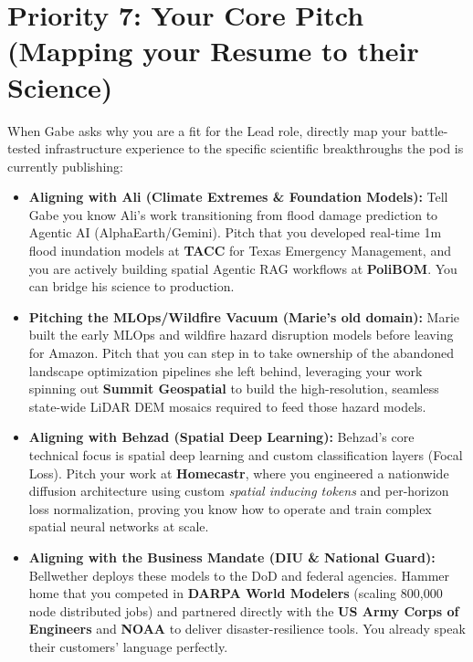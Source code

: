 \documentclass[11pt]{article}
\begin{document}
\section{Priority 7: Your Core Pitch (Mapping your Resume to their Science)}
When Gabe asks why you are a fit for the Lead role, directly map your battle-tested infrastructure experience to the specific scientific breakthroughs the pod is currently publishing:

\begin{itemize}[leftmargin=*]
    \item \textbf{Aligning with Ali (Climate Extremes \& Foundation Models):} Tell Gabe you know Ali's work transitioning from flood damage prediction to Agentic AI (AlphaEarth/Gemini). Pitch that you developed real-time 1m flood inundation models at \textbf{TACC} for Texas Emergency Management, and you are actively building spatial Agentic RAG workflows at \textbf{PoliBOM}. You can bridge his science to production.
    \item \textbf{Pitching the MLOps/Wildfire Vacuum (Marie's old domain):} Marie built the early MLOps and wildfire hazard disruption models before leaving for Amazon. Pitch that you can step in to take ownership of the abandoned landscape optimization pipelines she left behind, leveraging your work spinning out \textbf{Summit Geospatial} to build the high-resolution, seamless state-wide LiDAR DEM mosaics required to feed those hazard models.
    \item \textbf{Aligning with Behzad (Spatial Deep Learning):} Behzad's core technical focus is spatial deep learning and custom classification layers (Focal Loss). Pitch your work at \textbf{Homecastr}, where you engineered a nationwide diffusion architecture using custom \textit{spatial inducing tokens} and per-horizon loss normalization, proving you know how to operate and train complex spatial neural networks at scale.
    \item \textbf{Aligning with the Business Mandate (DIU \& National Guard):} Bellwether deploys these models to the DoD and federal agencies. Hammer home that you competed in \textbf{DARPA World Modelers} (scaling 800,000 node distributed jobs) and partnered directly with the \textbf{US Army Corps of Engineers} and \textbf{NOAA} to deliver disaster-resilience tools. You already speak their customers' language perfectly.
\end{itemize}
\end{document}
